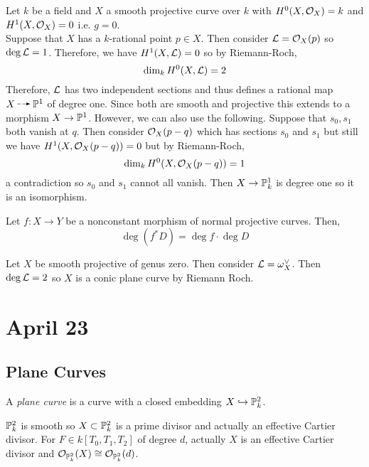 \documentclass[12pt]{article}
\begin{document}
\begin{example}
Let $k$ be a field and $X$ a smooth projective curve over $k$ with $H^0(X, \struct{X}) = k$ and $H^1(X, \struct{X}) = 0$ i.e. $g = 0$. 
\bigskip\\
Suppose that $X$ has a $k$-rational point $p \in X$. Then consider $\L = \struct{X}(p)$ so $\deg{\L} = 1$. Therefore, we have $H^1(X, \L) = 0$ so by Riemann-Roch,
\[ \dim_k H^0(X, \L) = 2 \]
Therefore, $\L$ has two independent sections and thus defines a rational map $X \rat \P^1$ of degree one. Since both are smooth and projective this extends to a morphism $X \to \P^1$.
However, we can also use the following. Suppose that $s_0, s_1$ both vanish at $q$. Then consider $\struct{X}(p - q)$ which has sections $s_0$ and $s_1$ but still we have $H^1(X, \struct{X}(p - q)) = 0$ but by Riemann-Roch,
\[ \dim_k H^0(X, \struct{X}(p - q)) = 1 \]
a contradiction so $s_0$ and $s_1$ cannot all vanish. Then $X \to \P^1_k$ is degree one so it is an isomorphism.
\end{example}

\begin{lemma}
Let $f : X \to  Y$ be a nonconstant morphism of normal projective curves. Then,
\[ \deg{(f^* D)} = \deg{f} \cdot \deg{D} \]
\end{lemma}

\begin{rmk}
Let $X$ be smooth projective of genus zero. Then consider $\L = \omega_X^\vee$. Then $\deg{\L} = 2$ so $X$ is a conic plane curve by Riemann Roch. 
\end{rmk}

\section{April 23}

\subsection{Plane Curves}

\begin{defn}
A \textit{plane curve} is a curve with a closed embedding $X \embed \P^2_k$.
\end{defn}

\begin{rmk}
$\P^2_k$ is smooth so $X \subset \P^2_k$ is a prime divisor and actually an effective Cartier divisor. For $F \in k[T_0, T_1, T_2]$ of degree $d$, actually $X$ is an effective Cartier divisor and $\struct{\P^2_k}(X) \cong \struct{\P^2_k}(d)$. 
\end{rmk}
\end{document}
